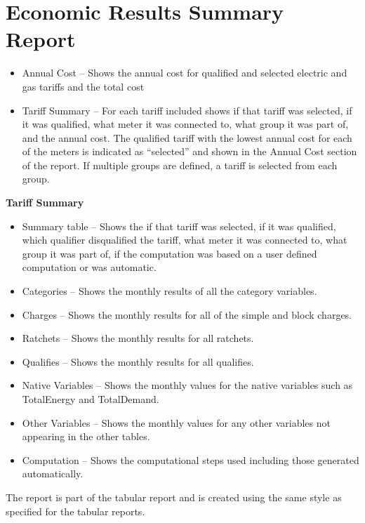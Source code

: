 \section{Economic Results Summary Report}\label{economic-results-summary-report}

\begin{itemize}
\item
  Annual Cost -- Shows the annual cost for qualified and selected electric and gas tariffs and the total cost
\item
  Tariff Summary -- For each tariff included shows if that tariff was selected, if it was qualified, what meter it was connected to, what group it was part of, and the annual cost. The qualified tariff with the lowest annual cost for each of the meters is indicated as ``selected'' and shown in the Annual Cost section of the report. If multiple groups are defined, a tariff is selected from each group.
\end{itemize}

\textbf{Tariff Summary}

\begin{itemize}
\item
  Summary table -- Shows the if that tariff was selected, if it was qualified, which qualifier disqualified the tariff, what meter it was connected to, what group it was part of, if the computation was based on a user defined computation or was automatic.
\item
  Categories -- Shows the monthly results of all the category variables.
\item
  Charges -- Shows the monthly results for all of the simple and block charges.
\item
  Ratchets -- Shows the monthly results for all ratchets.
\item
  Qualifies -- Shows the monthly results for all qualifies.
\item
  Native Variables -- Shows the monthly values for the native variables such as TotalEnergy and TotalDemand.
\item
  Other Variables -- Shows the monthly values for any other variables not appearing in the other tables.
\item
  Computation -- Shows the computational steps used including those generated automatically.
\end{itemize}

The report is part of the tabular report and is created using the same style as specified for the tabular reports.
